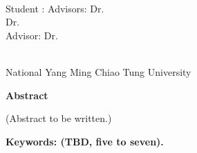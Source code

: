 \begin{center}
    \large
    
    \begin{singlespace}
        \textbf{\englishTitle{}} \\[0.5cm]
    \end{singlespace}
    
    \begin{singlespace}
        Student : \studentEnName{}  \hspace{1.0cm} 
        \ifdefined\advisorCnNameB
            Advisors: Dr.\, \advisorEnName \\
            \hspace{6.6cm} Dr.\, \advisorEnNameB  \\
        \else
            Advisor: Dr.\, \advisorEnName \\
        \fi
    \end{singlespace}
    
    \vspace{0.5cm}
    \begin{singlespace}
        \NameofDepartmentInstituteEN\\
        National Yang Ming Chiao Tung University\\[0.2cm]
    \end{singlespace}
    
    \textbf{Abstract} \\[0.5cm]

\end{center}

\normalsize 
  
(Abstract to be written.)


\vspace{1cm}

\textbf{Keywords: (TBD, five to seven).}
